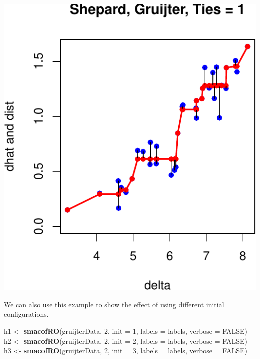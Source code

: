 \documentclass[
  12pt,
]{article}
\newenvironment{Shaded}{\begin{snugshade}}{\end{snugshade}}
\newcommand{\AttributeTok}[1]{\textcolor[rgb]{0.13,0.29,0.53}{#1}}
\newcommand{\ConstantTok}[1]{\textcolor[rgb]{0.56,0.35,0.01}{#1}}
\newcommand{\DecValTok}[1]{\textcolor[rgb]{0.00,0.00,0.81}{#1}}
\newcommand{\FunctionTok}[1]{\textcolor[rgb]{0.13,0.29,0.53}{\textbf{#1}}}
\newcommand{\NormalTok}[1]{#1}
\newcommand{\OtherTok}[1]{\textcolor[rgb]{0.56,0.35,0.01}{#1}}
\begin{document}
\begin{center}\includegraphics{smacofRO_files/figure-latex/plotgruijter-1} \end{center}

We can also use this example to show the effect of using different initial configurations.

\begin{Shaded}
\begin{Highlighting}[]
\NormalTok{h1 }\OtherTok{\textless{}{-}} \FunctionTok{smacofRO}\NormalTok{(gruijterData, }\DecValTok{2}\NormalTok{, }\AttributeTok{init =} \DecValTok{1}\NormalTok{, }\AttributeTok{labels =}\NormalTok{ labels, }\AttributeTok{verbose =} \ConstantTok{FALSE}\NormalTok{)}
\NormalTok{h2 }\OtherTok{\textless{}{-}} \FunctionTok{smacofRO}\NormalTok{(gruijterData, }\DecValTok{2}\NormalTok{, }\AttributeTok{init =} \DecValTok{2}\NormalTok{, }\AttributeTok{labels =}\NormalTok{ labels, }\AttributeTok{verbose =} \ConstantTok{FALSE}\NormalTok{)}
\NormalTok{h3 }\OtherTok{\textless{}{-}} \FunctionTok{smacofRO}\NormalTok{(gruijterData, }\DecValTok{2}\NormalTok{, }\AttributeTok{init =} \DecValTok{3}\NormalTok{, }\AttributeTok{labels =}\NormalTok{ labels, }\AttributeTok{verbose =} \ConstantTok{FALSE}\NormalTok{)}
\end{Highlighting}
\end{Shaded}
\end{document}
